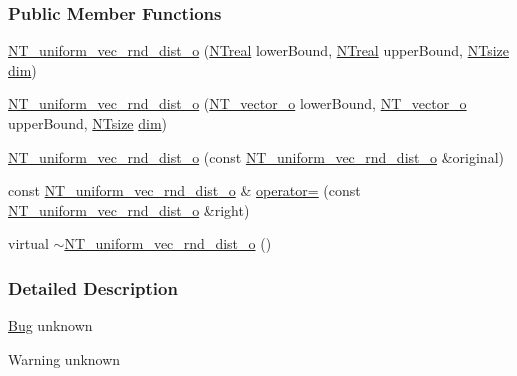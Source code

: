 \subsubsection*{Public Member Functions}
\begin{DoxyCompactItemize}
\item 
\hyperlink{class_n_t__uniform__vec__rnd__dist__o_abe228edbb92f1f13c48c85febff12e69}{NT\_\-uniform\_\-vec\_\-rnd\_\-dist\_\-o} (\hyperlink{nt__types_8h_a814a97893e9deb1eedcc7604529ba80d}{NTreal} lowerBound, \hyperlink{nt__types_8h_a814a97893e9deb1eedcc7604529ba80d}{NTreal} upperBound, \hyperlink{nt__types_8h_a06c124f2e4469769b58230253ce0560b}{NTsize} \hyperlink{class_n_t__vec__rnd__dist__o_a708a77a7d135e0dec8201b36c0a55fa2}{dim})
\item 
\hyperlink{class_n_t__uniform__vec__rnd__dist__o_afaedee383ddd58eed7fe2220ada14622}{NT\_\-uniform\_\-vec\_\-rnd\_\-dist\_\-o} (\hyperlink{class_n_t__vector__o}{NT\_\-vector\_\-o} lowerBound, \hyperlink{class_n_t__vector__o}{NT\_\-vector\_\-o} upperBound, \hyperlink{nt__types_8h_a06c124f2e4469769b58230253ce0560b}{NTsize} \hyperlink{class_n_t__vec__rnd__dist__o_a708a77a7d135e0dec8201b36c0a55fa2}{dim})
\item 
\hyperlink{class_n_t__uniform__vec__rnd__dist__o_afdf53eaaa393015d4b38d9f52a3dada8}{NT\_\-uniform\_\-vec\_\-rnd\_\-dist\_\-o} (const \hyperlink{class_n_t__uniform__vec__rnd__dist__o}{NT\_\-uniform\_\-vec\_\-rnd\_\-dist\_\-o} \&original)
\item 
const \hyperlink{class_n_t__uniform__vec__rnd__dist__o}{NT\_\-uniform\_\-vec\_\-rnd\_\-dist\_\-o} \& \hyperlink{class_n_t__uniform__vec__rnd__dist__o_a0d66b009e0888fbfaa086ec7ff7cdfc7}{operator=} (const \hyperlink{class_n_t__uniform__vec__rnd__dist__o}{NT\_\-uniform\_\-vec\_\-rnd\_\-dist\_\-o} \&right)
\item 
virtual \hyperlink{class_n_t__uniform__vec__rnd__dist__o_a39f385be9ef22cc6979fbce5de72933c}{$\sim$NT\_\-uniform\_\-vec\_\-rnd\_\-dist\_\-o} ()
\end{DoxyCompactItemize}


\subsubsection{Detailed Description}
\begin{Desc}
\item[\hyperlink{bug__bug000110}{Bug}]unknown \end{Desc}
\begin{DoxyWarning}{Warning}
unknown 
\end{DoxyWarning}


